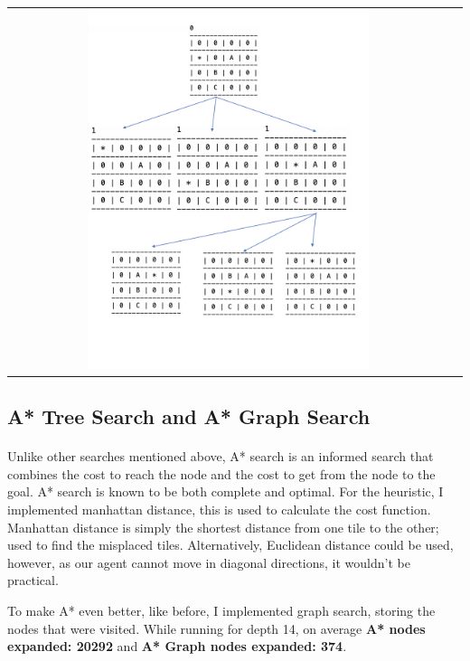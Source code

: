 \documentclass[10pt]{article}
\begin{document}
  \begin{center}
    \begin{tabular}{cc}
    \includegraphics[width=0.65\textwidth]{images/ids.png} \\
      \end{tabular}
    \end{center}

  \subsection{A* Tree Search and A* Graph Search}
  \paragraph{} \indent
  Unlike other searches mentioned above, A* search is an informed search that combines the cost to reach the node and the cost to get from the node to the goal. A* search is known to be both complete and optimal. For the heuristic, I implemented manhattan distance, this is used to calculate the cost function. Manhattan distance is simply the shortest distance from one tile to the other; used to find the misplaced tiles. Alternatively, Euclidean distance could be used, however, as our agent cannot move in diagonal directions, it wouldn't be practical.

  To make A* even better, like before, I implemented graph search, storing the nodes that were visited.
  While running for depth 14, on average \textbf{A* nodes expanded: 20292 } and \textbf{A* Graph nodes expanded: 374}.
\end{document}
